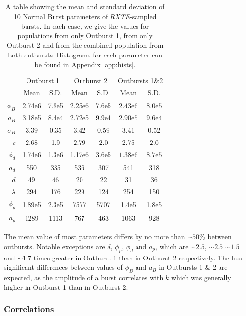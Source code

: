 \begin{table}
\centering
\begin{tabular}{r c c c c c c}
\hline
\hline
 & \multicolumn{2}{c}{\scriptsize Outburst 1} & \multicolumn{2}{c}{\scriptsize Outburst 2} & \multicolumn{2}{c}{\scriptsize Outbursts 1\&2}  \\
 &Mean&S.D.&Mean&S.D.&Mean&S.D.\\
\hline
$\phi_B$&2.74e6&7.8e5&2.25e6&7.6e5&$2.43\mathrm{e}6$&$8.0\mathrm{e}5$\\
$a_B$&3.18e5&8.4e4&2.72e5&9.9e4&$2.90\mathrm{e}5$&$9.6\mathrm{e}4$\\
$\sigma_B$&3.39&0.35&3.42&0.59&3.41&0.52\\
$c$&2.68&1.9&2.79&2.0&2.75&2.0\\
$\phi_d$&1.74e6&1.3e6&1.17e6&3.6e5&$1.38\mathrm{e}6$&$8.7\mathrm{e}5$\\
$a_d$&550&335&536&307&541&318\\
$d$&49&46&20&22&31&36\\
$\lambda$&294&176&229&124&254&150\\
$\phi_p$&1.89e5&2.3e5&7577&5707&1.4e5&1.8e5\\
$a_p$&1289&1113&767&463&1063&928\\
\hline
\hline
\end{tabular}
\caption[A table showing the mean and standard deviation of 10 Normal Burst parameters of \textit{RXTE}-sampled bursts.]{A table showing the mean and standard deviation of 10 Normal Burst parameters of \textit{RXTE}-sampled bursts.  In each case, we give the values for populations from only Outburst 1, from only Outburst 2 and from the combined population from both outbursts.  Histograms for each parameter can be found in Appendix \ref{app:hists}.}
\label{tab:params_perob}
\end{table}

\par The mean value of most parameters differs by no more than $\sim50$\% between outbursts.  Notable exceptions are $d$, $\phi_p$, $\phi_d$ and $a_p$, which are $\sim2.5$, $\sim2.5$ $\sim1.5$ and $\sim1.7$ times greater in Outburst 1 than in Outburst 2 respectively.  The less significant differences between values of $\phi_B$ and $a_B$ in Outbursts 1 \& 2 are expected, as the amplitude of a burst correlates with $k$ which was generally higher in Outburst 1 than in Outburst 2.

\subsubsection{Correlations}

